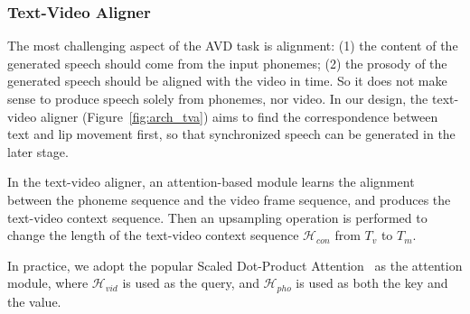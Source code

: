 \documentclass{article}
\begin{document}
\subsubsection{Text-Video Aligner}
\label{sec:tv_aligner}
The most challenging aspect of the AVD task is alignment: (1) the content of the generated speech should come from the input phonemes; (2) the prosody of the generated speech should be aligned with the video in time. So it does not make sense to produce speech solely from phonemes, nor video.
In our design, the text-video aligner (Figure~\ref{fig:arch_tva}) aims to find the correspondence between text and lip movement first, so that synchronized speech can be generated in the later stage.

In the text-video aligner, an attention-based module learns the alignment between the phoneme sequence and the video frame sequence, and produces the text-video context sequence. Then an upsampling operation is performed to change the length of the text-video context sequence $\mathcal{H}_{con}$ from $T_v$ to $T_m$.

In practice, we adopt the popular Scaled Dot-Product Attention~\cite{vaswani2017attention} as the attention module, where $\mathcal{H}_{vid}$ is used as the query, and  $\mathcal{H}_{pho}$ is used as both the key and the value. 
\end{document}
